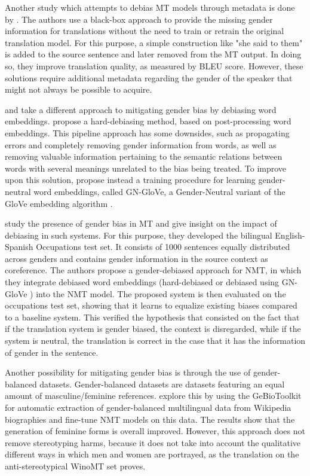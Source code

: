 Another study which attempts to debias MT models through metadata is done by \citet{Moryossef_2019}. The authors use a black-box approach to provide the missing gender information for translations without the need to train or retrain the original translation model. For this purpose, a simple construction like "she said to them" is added to the source sentence and later removed from the MT output. In doing so, they improve translation quality, as measured by BLEU score. However, these solutions require additional metadata regarding the gender of the speaker that might not always be possible to acquire.

\citet{bolukbasi2016man} and \citet{Zhao_2018_GN-GloVe} take a different approach to mitigating gender bias by debiasing word embeddings. \citet{bolukbasi2016man} propose a hard-debiasing method, based on post-processing word embeddings. This pipeline approach has some downsides, such as propagating errors and completely removing gender information from words, as well as removing valuable information pertaining to the semantic relations between words with several meanings unrelated to the bias being treated.
To improve upon this solution, \citet{Zhao_2018_GN-GloVe} propose instead a training procedure for learning gender-neutral word embeddings, called GN-GloVe, a Gender-Neutral variant of the GloVe embedding algorithm \parencite{Glove}.

\citet{Escud_Font_2019} study the presence of gender bias in MT and give insight on
the impact of debiasing in such systems. For this purpose, they developed the bilingual English-Spanish Occupations test set. It consists of 1000 sentences equally distributed across genders and contains gender information in the source context as coreference. The authors propose a gender-debiased approach for NMT, in which they integrate debiased word embeddings (hard-debiased \parencite{bolukbasi2016man} or debiased using GN-GloVe \parencite{Zhao_2018_GN-GloVe}) into the NMT model. The proposed system is then evaluated on the occupations test set, showing that it learns to equalize existing biases compared to a baseline system. This verified the hypothesis that consisted on the fact that if the translation system is gender biased, the context is disregarded, while if the system is neutral, the translation is correct in the case that it has the information of gender in the sentence.

Another possibility for mitigating gender bias is through the use of gender-balanced datasets. Gender-balanced datasets are datasets featuring an equal amount of masculine/feminine references. \citet{costa2020fine} explore this by using the GeBioToolkit \parencite{costa2019gebiotoolkit} for automatic extraction of gender-balanced multilingual data from Wikipedia biographies and fine-tune NMT models on this data. The results show that the generation of feminine forms is overall improved. However, this approach does not remove stereotyping harms, because it does not take into account the qualitative different ways in which men and women are portrayed, as the translation on the anti-stereotypical WinoMT set proves.

